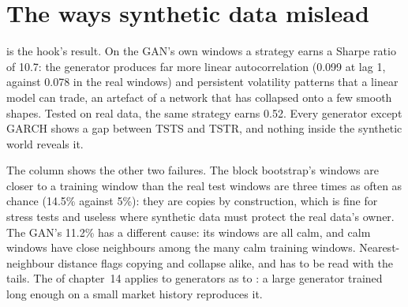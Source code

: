 \section{The ways synthetic data mislead}

 is the hook's result. On the GAN's own windows a strategy earns a Sharpe ratio of 10.7: the
generator produces far more linear autocorrelation (0.099 at lag 1, against 0.078 in the real windows) and persistent
volatility patterns that a linear model can trade, an artefact of a network that has collapsed onto a few smooth shapes.
Tested on real data, the same strategy earns 0.52. Every generator except GARCH shows a gap between TSTS and TSTR, and
nothing inside the synthetic world reveals it.

\begin{omfigure}

\label{fig:ml:gen:sharpe}
\end{omfigure}

The  column shows the other two failures. The block bootstrap's windows are closer to a training window than
the real test windows are three times as often as chance (14.5\% against 5\%): they are copies by construction, which
is fine for stress tests and useless where synthetic data must protect the real data's owner. The GAN's 11.2\% has a
different cause: its windows are all calm, and calm windows have close neighbours among the many calm training windows.
Nearest-neighbour distance flags copying and collapse alike, and has to be read with the tails. The  of
chapter~14 applies to generators as to : a large generator trained long enough on a small market history
reproduces it.

